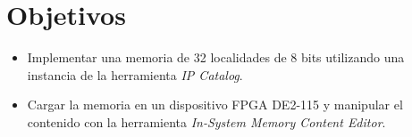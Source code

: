 \section{Objetivos \label{sec:obj}}


\begin{itemize} 
	\item Implementar una memoria de 32 localidades de 8 bits utilizando una instancia de la herramienta \textit{IP Catalog}.
	\item Cargar la memoria en un dispositivo FPGA DE2-115 y manipular el contenido con la herramienta \textit{In-System Memory Content Editor}.
\end{itemize}
